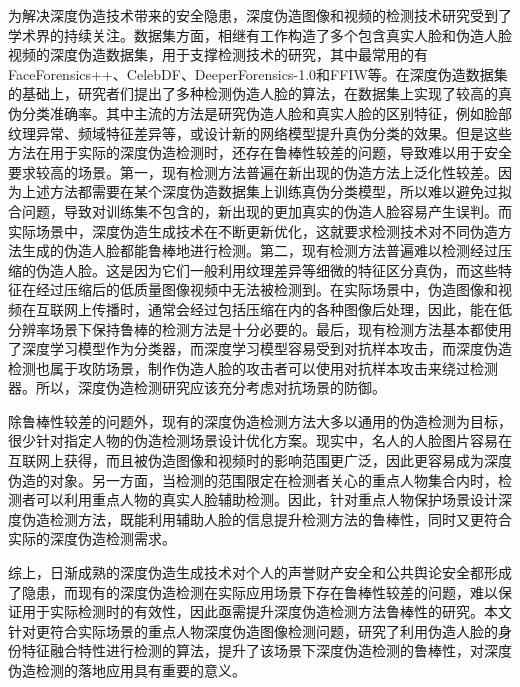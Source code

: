 为解决深度伪造技术带来的安全隐患，深度伪造图像和视频的检测技术研究受到了学术界的持续关注。数据集方面，相继有工作构造了多个包含真实人脸和伪造人脸视频的深度伪造数据集，用于支撑检测技术的研究，其中最常用的有FaceForensics++\cite{rossler2019faceforensics++}、CelebDF\cite{li2020celeb}、DeeperForensics-1.0\cite{jiang2020deeperforensics}和FFIW\cite{zhou2021face}等。在深度伪造数据集的基础上，研究者们提出了多种检测伪造人脸的算法，在数据集上实现了较高的真伪分类准确率。其中主流的方法是研究伪造人脸和真实人脸的区别特征，例如脸部纹理异常、频域特征差异等\cite{li2020face, qian2020thinking, haliassos2021lips}，或设计新的网络模型提升真伪分类的效果\cite{rossler2019faceforensics++, afchar2018mesonet, wang2022m2tr}。但是这些方法在用于实际的深度伪造检测时，还存在鲁棒性较差的问题，导致难以用于安全要求较高的场景\cite{dong2022protecting}。第一，现有检测方法普遍在新出现的伪造方法上泛化性较差。因为上述方法都需要在某个深度伪造数据集上训练真伪分类模型，所以难以避免过拟合问题，导致对训练集不包含的，新出现的更加真实的伪造人脸容易产生误判。而实际场景中，深度伪造生成技术在不断更新优化，这就要求检测技术对不同伪造方法生成的伪造人脸都能鲁棒地进行检测。第二，现有检测方法普遍难以检测经过压缩的伪造人脸。这是因为它们一般利用纹理差异等细微的特征区分真伪，而这些特征在经过压缩后的低质量图像视频中无法被检测到。在实际场景中，伪造图像和视频在互联网上传播时，通常会经过包括压缩在内的各种图像后处理，因此，能在低分辨率场景下保持鲁棒的检测方法是十分必要的。最后，现有检测方法基本都使用了深度学习模型作为分类器，而深度学习模型容易受到对抗样本攻击\cite{szegedy2013intriguing}，而深度伪造检测也属于攻防场景，制作伪造人脸的攻击者可以使用对抗样本攻击来绕过检测器\cite{hussain2021adversarial}。所以，深度伪造检测研究应该充分考虑对抗场景的防御。

除鲁棒性较差的问题外，现有的深度伪造检测方法大多以通用的伪造检测为目标，很少针对指定人物的伪造检测场景设计优化方案。现实中，名人的人脸图片容易在互联网上获得，而且被伪造图像和视频时的影响范围更广泛，因此更容易成为深度伪造的对象。另一方面，当检测的范围限定在检测者关心的重点人物集合内时，检测者可以利用重点人物的真实人脸辅助检测\cite{dong2022protecting}。因此，针对重点人物保护场景设计深度伪造检测方法，既能利用辅助人脸的信息提升检测方法的鲁棒性，同时又更符合实际的深度伪造检测需求。

综上，日渐成熟的深度伪造生成技术对个人的声誉财产安全和公共舆论安全都形成了隐患，而现有的深度伪造检测在实际应用场景下存在鲁棒性较差的问题，难以保证用于实际检测时的有效性，因此亟需提升深度伪造检测方法鲁棒性的研究。本文针对更符合实际场景的重点人物深度伪造图像检测问题，研究了利用伪造人脸的身份特征融合特性进行检测的算法，提升了该场景下深度伪造检测的鲁棒性，对深度伪造检测的落地应用具有重要的意义。

